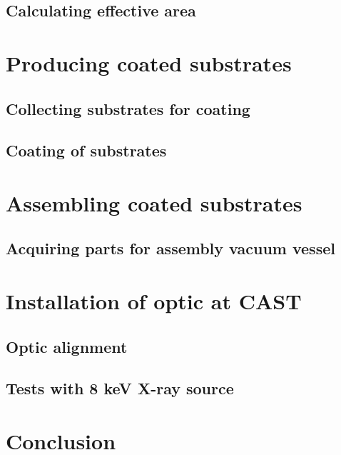 \subsection{Calculating effective area}\label{sec:eff_area}

\section{Producing coated substrates}


\subsection{Collecting substrates for coating}

\subsection{Coating of substrates}



\section{Assembling coated substrates}


\subsection{Acquiring parts for assembly vacuum vessel}


\section{Installation of optic at CAST}


\subsection{Optic alignment}

\subsection{Tests with 8 keV X-ray source}

\section{Conclusion}
